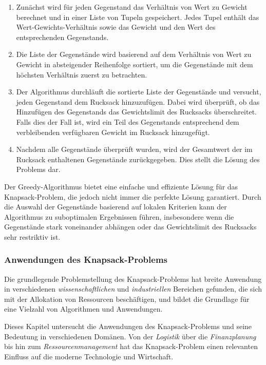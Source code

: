 \begin{enumerate}
\item Zunächst wird für jeden Gegenstand das Verhältnis von Wert zu Gewicht berechnet und in einer Liste von Tupeln
gespeichert. Jedes Tupel enthält das Wert-Gewichts-Verhältnis sowie das Gewicht und den Wert des entsprechenden Gegenstands.
\item Die Liste der Gegenstände wird basierend auf dem Verhältnis von Wert zu Gewicht in absteigender Reihenfolge
sortiert, um die Gegenstände mit dem höchsten Verhältnis zuerst zu betrachten.
\item Der Algorithmus durchläuft die sortierte Liste der Gegenstände und versucht, jeden Gegenstand dem Rucksack
hinzuzufügen. Dabei wird überprüft, ob das Hinzufügen des Gegenstands das Gewichtslimit des Rucksacks überschreitet.
Falls dies der Fall ist, wird ein Teil des Gegenstands entsprechend dem verbleibenden verfügbaren Gewicht im Rucksack hinzugefügt.
\item Nachdem alle Gegenstände überprüft wurden, wird der Gesamtwert der im Rucksack enthaltenen Gegenstände zurückgegeben.
Dies stellt die Lösung des Problems dar.
\end{enumerate}

Der Greedy-Algorithmus bietet eine einfache und effiziente Lösung für das Knapsack-Problem, die jedoch nicht immer die
perfekte Lösung garantiert. Durch die Auswahl der Gegenstände basierend auf lokalen Kriterien kann der Algorithmus zu
suboptimalen Ergebnissen führen, insbesondere wenn die Gegenstände stark voneinander abhängen oder das Gewichtslimit des
Rucksacks sehr restriktiv ist.

\subsubsection{Anwendungen des Knapsack-Problems}
Die grundlegende Problemstellung des Knapsack-Problems hat breite Anwendung in verschiedenen \textit{wissenschaftlichen}
und \textit{industriellen} Bereichen gefunden, die sich mit der Allokation von Ressourcen beschäftigen, und bildet die
Grundlage für eine Vielzahl von Algorithmen und Anwendungen.

Dieses Kapitel untersucht die Anwendungen des Knapsack-Problems und seine Bedeutung in verschiedenen Domänen. Von der
\textit{Logistik} über die \textit{Finanzplanung} bis hin zum \textit{Ressourcenmanagement} hat das Knapsack-Problem
einen relevanten Einfluss auf die moderne Technologie und Wirtschaft.

